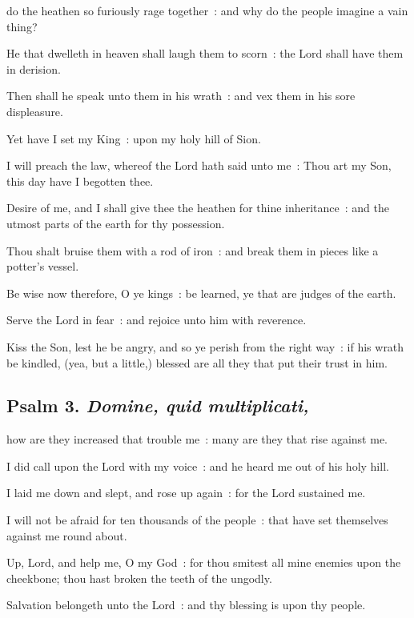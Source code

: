  do the heathen so furiously rage together~: and why do the people imagine a vain thing?\par
{}
He that dwelleth in heaven shall laugh them to scorn~: the Lord shall have them in derision.\par
{}Then shall he speak unto them in his wrath~: and vex them in his sore displeasure.\par
{}Yet have I set my King~: upon my holy hill of Sion.\par
{}I will preach the law, whereof the Lord hath said unto me~: Thou art my Son, this day have I begotten thee.\par
{}Desire of me, and I shall give thee the heathen for thine inheritance~: and the utmost parts of the earth for thy possession.\par
{}Thou shalt bruise them with a rod of iron~: and break them in pieces like a potter's vessel.\par
{}Be wise now therefore, O ye kings~: be learned, ye that are judges of the earth.\par
{}Serve the Lord in fear~: and rejoice unto him with reverence.\par
{}Kiss the Son, lest he be angry, and so ye perish from the right way~: if his wrath be kindled, (yea, but a little,) blessed are all they that put their trust in him.\par

\subsection{Psalm 3. \textit{Domine, quid multiplicati,}}

 how are they increased that trouble me~: many are they that rise against me.\par
{}
I did call upon the Lord with my voice~: and he heard me out of his holy hill.\par
{}I laid me down and slept, and rose up again~: for the Lord sustained me.\par
{}I will not be afraid for ten thousands of the people~: that have set themselves against me round about.\par
{}Up, Lord, and help me, O my God~: for thou smitest all mine enemies upon the cheekbone; thou hast broken the teeth of the ungodly.\par
{}Salvation belongeth unto the Lord~: and thy blessing is upon thy people.\par

